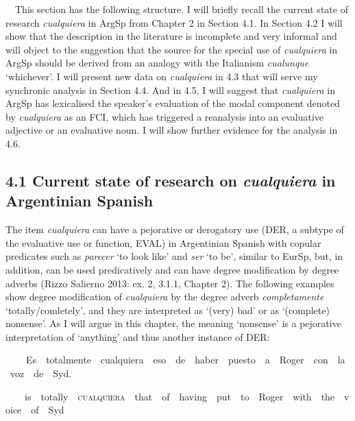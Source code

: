 \begin{styleStandard}
\ \ This section has the following structure. I will briefly recall the current state of research \textit{cualquiera} in ArgSp from Chapter 2 in Section 4.1. In Section 4.2 I will show that the description in the literature is incomplete and very informal and will object to the suggestion that the source for the special use of \textit{cualquiera} in ArgSp should be derived from an analogy with the Italianism \textit{cualunque} ‘whichever’. I will present new data on \textit{cualquiera} in 4.3 that will serve my synchronic analysis in Section 4.4. And in 4.5, I will suggest that \textit{cualquiera} in ArgSp has lexicalised the speaker’s evaluation of the modal component denoted by \textit{cualquiera} as an FCI, which has triggered a reanalysis into an evaluative adjective or an evaluative noun. I will show further evidence for the analysis in 4.6. 
\end{styleStandard}

\subsection[4.1 Current state of research on cualquiera in Argentinian Spanish]{\textbf{4.1 Current state of research on}\textbf{\textit{ cualquiera}}\textbf{ in Argentinian Spanish}}
\begin{styleStandard}
The item \textit{cualquiera} can have a pejorative or derogatory use (DER, a subtype of the evaluative use or function, EVAL) in Argentinian Spanish with copular predicates such as \textit{parecer} ‘to look like’ and \textit{ser} ‘to be’, similar to EurSp, but, in addition, can be used predicatively and can have degree modification by degree adverbs (Rizzo Salierno 2013: ex. 2, 3.1.1, Chapter 2). The following examples show degree modification of \textit{cualquiera} by the degree adverb \textit{completamente} ‘totally/comletely’, and they are interpreted as ‘(very) bad’ or as ‘(complete) nonsense’. As I will argue in this chapter, the meaning ‘nonsense’ is a pejorative interpretation of ‘anything’ and thus another instance of DER:
\end{styleStandard}

\begin{styleStandard}
\textbf{\ \ }\ \ Es\ \ totalmente\ \ cualquiera\ \ eso\ \ de\ \ haber\ \ puesto\ \ a\ \ Roger\ \ con\ \ la\ \ voz\ \ de\ \ Syd.
\end{styleStandard}

\begin{styleStandard}
\ \ \ \ is\ \ totally\ \ \textsc{cualquiera}\ \ that\ \ of\ \ having\ \ put\ \ to\ \ Roger\ \ with\ \ the\ \ voice\ \ of\ \ Syd
\end{styleStandard}

